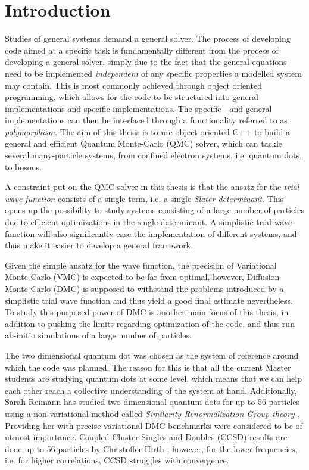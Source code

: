 \chapter{Introduction}

Studies of general systems demand a general solver. The process of developing code aimed at a specific task is fundamentally different from the process of developing a general solver, simply due to the fact that the general equations need to be implemented \textit{independent} of any specific properties a modelled system may contain. This is most commonly achieved through object oriented programming, which allows for the code to be structured into general implementations and specific implementations. The specific - and general implementations can then be interfaced through a functionality referred to as \textit{polymorphism}. The aim of this thesis is to use object oriented C++ to build a general and efficient Quantum Monte-Carlo (QMC) solver, which can tackle several many-particle systems, from confined electron systems, i.e. quantum dots, to bosons.  

A constraint put on the QMC solver in this thesis is that the ansatz for the \textit{trial wave function} consists of a single term, i.e. a single \textit{Slater determinant}. This opens up the possibility to study systems consisting of a large number of particles due to efficient optimizations in the single determinant. A simplistic trial wave function will also  significantly ease the implementation of different systems, and thus make it easier to develop a general framework. 

Given the simple ansatz for the wave function, the precision of Variational Monte-Carlo (VMC) is expected to be far from optimal, however, Diffusion Monte-Carlo (DMC) is supposed to withstand the problems introduced by a simplistic trial wave function and thus yield a good final estimate nevertheless. To study this purposed power of DMC is another main focus of this thesis, in addition to pushing the limits regarding optimization of the code, and thus run ab-initio simulations of a large number of particles.

The two dimensional quantum dot was chosen as the system of reference around which the code was planned. The reason for this is that all the current Master students are studying quantum dots at some level, which means that we can help each other reach a collective understanding of the system at hand. Additionally, Sarah Reimann has studied two dimensional quantum dots for up to 56 particles using a non-variational method called \textit{Similarity Renormalization Group theory} \cite{verdensBesteArtikkel}. Providing her with precise variational DMC benchmarks were considered to be of utmost importance. Coupled Cluster Singles and Doubles (CCSD) results are done up to 56 particles by Christoffer Hirth \cite{Hirth}, however, for the lower frequencies, i.e. for higher correlations, CCSD struggles with convergence.   

